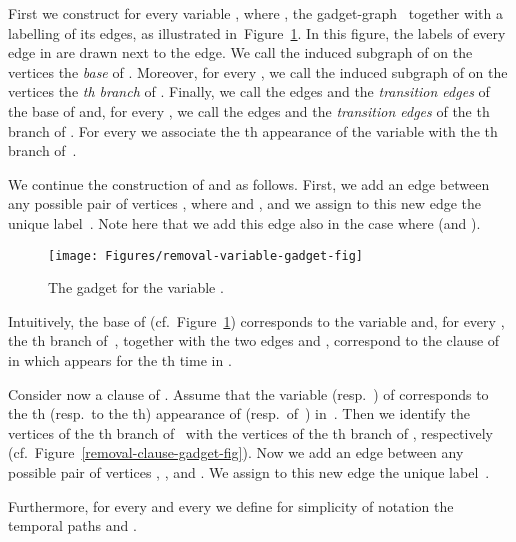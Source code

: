 \documentclass[a4paper,UKenglish]{article}
\begin{document}
First we construct for every variable , where , 
the gadget-graph~ together with a labelling  of its edges, 
as illustrated in~Figure~\ref{removal-variable-gadget-fig}. 
In this figure, the labels of every edge in  are drawn next to the edge. 
We call the induced subgraph of  on the  vertices  the \emph{base} of . Moreover, for every , we call the induced
subgraph of  on the  vertices  the \emph{th
branch} of . Finally, we call the edges  and  the \emph{transition edges} of the base of  and, for every , we call the edges  and  the \emph{transition edges} of the th branch of . 
For every  we associate the th appearance of the variable   with the th
branch of~.


We continue the construction of  and  as
follows. First, we add an edge between any possible pair of vertices , where  and , and we assign to this new edge  the unique label~.
Note here that we add this edge  also in the
case where  (and ). 


\begin{figure}[tbh]
\centering\texttt{[image: Figures/removal-variable-gadget-fig]}
\caption{The gadget  for the variable .}
\label{removal-variable-gadget-fig}
\end{figure}



Intuitively, the base of  (cf.~Figure~\ref{removal-variable-gadget-fig}) 
corresponds to the variable  and, 
for every , the th branch of~, together with the two edges  and , 
correspond to the clause of  in which  appears for the th time in .



Consider now a clause  of . Assume that
the variable  (resp.~) of  corresponds to
the th (resp.~to the th) appearance of  (resp.~of~) in~. Then we identify the vertices  
of the th branch of~ with the vertices  of the th branch
of , respectively (cf.~Figure~\ref{removal-clause-gadget-fig}). 
Now we add an edge between any
possible pair of vertices , , and .
We assign to this new edge  the unique label~.


Furthermore, for every  and every  we define for simplicity of notation the temporal paths  and .
 
\end{document}
